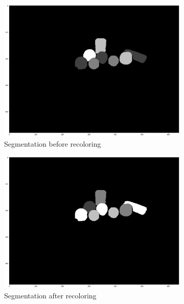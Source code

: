 \begin{figure}
\begin{subfigure}[t]{0.16\linewidth}
        \includegraphics[width=\textwidth]{figures/methods3.png}
        \caption{Segmentation before recoloring}
        \label{methods:pic3}
    \end{subfigure}
    \hfill
    \begin{subfigure}[t]{0.16\linewidth}
        \centering
        \includegraphics[width=\textwidth]{figures/methods4.png}
        \caption{Segmentation after recoloring}
        \label{methods:pic4}
    \end{subfigure}
    \hfill
    \begin{subfigure}[t]{0.16\linewidth}
        \centering

\end{subfigure}
\end{figure}
